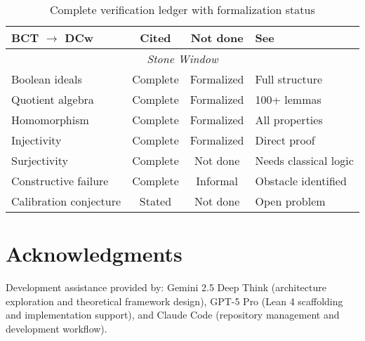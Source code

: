 \documentclass[11pt]{article}
\theoremstyle{plain}
\theoremstyle{definition}
\begin{document}
\begin{table}[h]
\begin{tabular}{|l|c|c|l|}
BCT $\rightarrow$ DCw & Cited & Not done & See \cite{Blair77} \\
\hline
\multicolumn{4}{|c|}{\textit{Stone Window}} \\
\hline
Boolean ideals & Complete & Formalized & Full structure \\
Quotient algebra & Complete & Formalized & 100+ lemmas \\
Homomorphism & Complete & Formalized & All properties \\
Injectivity & Complete & Formalized & Direct proof \\
Surjectivity & Complete & Not done & Needs classical logic \\
Constructive failure & Complete & Informal & Obstacle identified \\
Calibration conjecture & Stated & Not done & Open problem \\
\hline
\end{tabular}
\caption{Complete verification ledger with formalization status}
\label{tab:complete-ledger}
\end{table}

\section*{Acknowledgments}
Development assistance provided by: Gemini 2.5 Deep Think (architecture exploration and theoretical framework design), GPT-5 Pro (Lean 4 scaffolding and implementation support), and Claude Code (repository management and development workflow).
\end{document}
